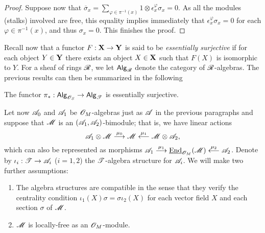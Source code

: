 \begin{proof}
Suppose now that $\overline{\sigma}_x=\sum_{\varphi \in \pi^{-1}(x)}1\otimes \epsilon^{\varphi}_x\sigma_x=0$. As all the modules (stalks) involved are free, this equality implies immediately that $\epsilon^{\varphi}_x\sigma_x=0$ for each $\varphi \in \pi^{-1}(x)$, and thus $\sigma_x=0$. This finishes the proof.
\end{proof}

Recall now that a functor $F:{\bf X}\to {\bf Y}$ is said to be \emph{essentially surjective} if for each object $Y\in {\bf Y}$ there exists an object $X\in {\bf X}$ such that $F(X)$ is isomorphic to $Y$. For a sheaf of rings $\mathscr{R}$, we let $\mathsf{Alg}_{\mathscr{R}}$ denote the category of $\mathscr{R}$-algebras. The previous results can then be summarized in the following

\begin{theorem}\label{esurjective}
The functor $\pi_*:\mathsf{Alg}_{\mathscr{O}_S}\to \mathsf{Alg}_{\mathscr{T}}$ is essentially surjective.
\end{theorem}


Let now $\mathscr{A}_0$ and $\mathscr{A}_1$ be $\mathscr{O}_M$-algebras just as $\mathscr{A}$ in the previous paragraphs and suppose that $\mathscr{M}$ is an $(\mathscr{A}_1,\mathscr{A}_2)$-bimodule; that is, we have linear actions
$$\mathscr{A}_1\otimes \mathscr{M}\stackrel{\mu_0}{\longrightarrow}\mathscr{M}\stackrel{\mu_1}{\longleftarrow}\mathscr{M}\otimes \mathscr{A}_2,$$
which can also be represented as morphisms $\mathscr{A}_1\stackrel{\mu_1}{\longrightarrow}\underline{\operatorname{End}}_{\mathscr{O}_M}(\mathscr{M})\stackrel{\mu_2}{\longleftarrow}\mathscr{A}_2$.
Denote by $\iota_i:\mathscr{T}\to \mathscr{A}_i$ ($i=1,2$) the $\mathscr{T}$-algebra structure for $\mathscr{A}_i$. We will make two further assumptions:
\begin{enumerate}
\item The algebra structures are compatible in the sense that they verify the centrality condition $\iota_1(X)\sigma =\sigma \iota_2(X)$ for each vector field $X$ and each section $\sigma $ of $\mathscr{M}$.
\item $\mathscr{M}$ is locally-free as an $\mathscr{O}_M$-module.
\end{enumerate}

